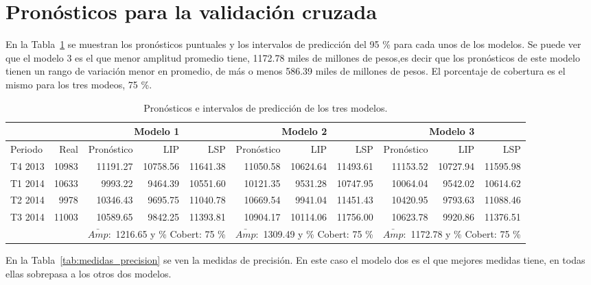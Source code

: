 \documentclass[11pt, letterpaper, twoside]{article}
\begin{document}
\section{Pronósticos para la validación cruzada}

En la Tabla~\ref{tab:pronosticos_modelos} se muestran los pronósticos puntuales y los intervalos de predicción del 95 \% para cada unos de los modelos. Se puede ver que el modelo 3 es el que menor amplitud promedio tiene, 1172.78 miles de millones de pesos,es decir que los pronósticos de este modelo tienen un rango de variación menor en promedio, de más o menos 586.39 miles de millones de pesos. El porcentaje de cobertura es el mismo para los tres modeos, 75 \%.



\begin{table}[ht]
\caption{Pronósticos e intervalos de predicción de los tres modelos.}
\label{tab:pronosticos_modelos}
\centering
\footnotesize{
\begin{tabular}{lr|rrr|rrr|rrr|}
\cline{3-11}
& & \multicolumn{3}{c|}{Modelo 1} & \multicolumn{3}{c|}{Modelo 2} & \multicolumn{3}{c|}{Modelo 3} \\
\hline
Periodo & Real & Pronóstico & LIP & LSP & Pronóstico & LIP & LSP & Pronóstico & LIP & LSP \\
\hline
T4 2013 & 10983 & 11191.27 & 10758.56 & 11641.38 & 11050.58 & 10624.64 & 11493.61 & 11153.52 & 10727.94 & 11595.98 \\
T1 2014 & 10633 & 9993.22 & 9464.39 & 10551.60 & 10121.35 & 9531.28 & 10747.95 & 10064.04 & 9542.02 & 10614.62 \\
T2 2014 & 9978  & 10346.43 & 9695.75 & 11040.78 & 10669.54 & 9941.04 & 11451.43 & 10420.95 & 9793.63 & 11088.46 \\
T3 2014 & 11003 & 10589.65 & 9842.25 & 11393.81 & 10904.17 & 10114.06 & 11756.00 & 10623.78 & 9920.86 & 11376.51 \\
\hline
& & \multicolumn{3}{c|}{$\bar{Amp}:$ 1216.65 y \% Cobert: 75 \%} & \multicolumn{3}{c|}{$\bar{Amp}:$ 1309.49 y \% Cobert: 75 \%} & \multicolumn{3}{c|}{$\bar{Amp}:$ 1172.78 y \% Cobert: 75 \%} \\
\cline{3-11}
\end{tabular}
}
\end{table}

En la Tabla~\ref{tab:medidas_precision} se ven la medidas de precisión. En este caso el modelo dos es el que mejores medidas tiene, en todas ellas sobrepasa a los otros dos modelos.
\end{document}
